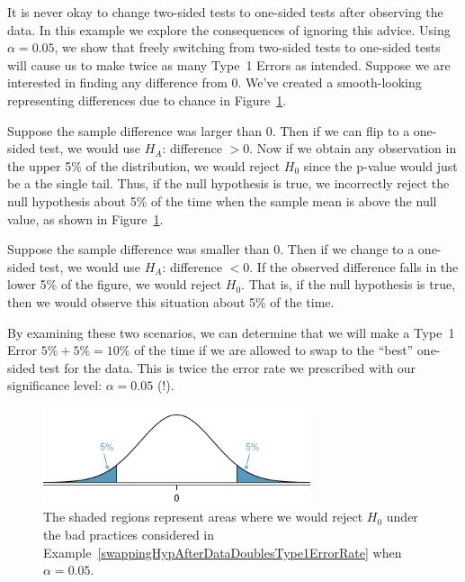 \begin{example}{It is never okay to change two-sided tests to one-sided tests after observing the data. In this example we explore the consequences of ignoring this advice. Using $\alpha=0.05$, we show that freely switching from two-sided tests to one-sided tests will cause us to make twice as many Type~1 Errors as intended.} \label{swappingHypAfterDataDoublesType1ErrorRate}
Suppose we are interested in finding any difference from 0. We've created a smooth-looking  representing differences due to chance in Figure~\ref{type1ErrorDoublingExampleFigure}.

Suppose the sample difference was larger than 0. Then if we can flip to a one-sided test, we would use $H_A$: difference $> 0$. Now if we obtain any observation in the upper 5\% of the distribution, we would reject $H_0$ since the p-value would just be a the single tail. Thus, if the null hypothesis is true, we incorrectly reject the null hypothesis about 5\% of the time when the sample mean is above the null value, as shown in Figure~\ref{type1ErrorDoublingExampleFigure}.

Suppose the sample difference was smaller than 0. Then if we change to a one-sided test, we would use $H_A$: difference $< 0$. If the observed difference falls in the lower 5\% of the figure, we would reject $H_0$. That is, if the null hypothesis is true, then we would observe this situation about 5\% of the time.

By examining these two scenarios, we can determine that we will make a Type~1 Error $5\%+5\%=10\%$ of the time if we are allowed to swap to the ``best'' one-sided test for the data. This is twice the error rate we prescribed with our significance level: $\alpha=0.05$ (!).

\begin{figure}[ht]
   \centering
   \includegraphics[width=0.7\textwidth]{02/figures/type1ErrorDoublingExampleFigure/type1ErrorDoublingExampleFigure}
   \caption{The shaded regions represent areas where we would reject $H_0$ under the bad practices considered in Example~\ref{swappingHypAfterDataDoublesType1ErrorRate} when $\alpha = 0.05$.}
   \label{type1ErrorDoublingExampleFigure}
\end{figure}

\end{example}

